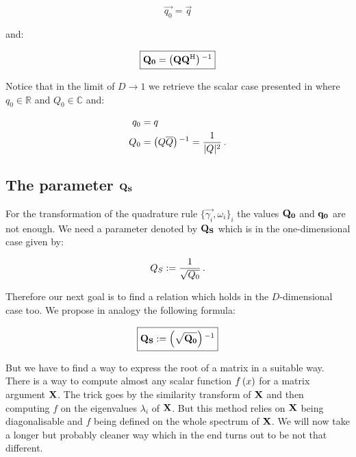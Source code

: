 \begin{equation} \label{eq:quad_mix_Dd_homog_q0}
\boxed{
  \vec{q_0} = \vec{q}
}
\end{equation}

and:

\begin{equation} \label{eq:quad_mix_Dd_homog_Q0}
\boxed{
  \mathbf{Q_0} = \left( \mathbf{Q} \mathbf{Q}{}^{\textnormal{H}} \right){}^{-1}
}
\end{equation}

Notice that in the limit of $D \rightarrow 1$ we retrieve the scalar case
presented in \cite{B_bachelor_thesis} where $q_0 \in \mathbb{R}$ and
$Q_0 \in \mathbb{C}$ and:

\begin{align*}
  q_0 & = q \\
  Q_0 & = \left( Q \overline{Q} \right){}^{-1} = \frac{1}{|Q|^2} \,.
\end{align*}


\subsection{The parameter $\mathbf{Q_S}$}


For the transformation of the quadrature rule $\{\vec{\gamma_i}, \omega_i\}_i$
the values $\mathbf{Q_0}$ and $\mathbf{q_0}$ are not enough. We need a parameter
denoted by $\mathbf{Q_S}$ which is in the one-dimensional case given by:

\begin{equation*}
  Q_S := \frac{1}{\sqrt{Q_0}} \,.
\end{equation*}

Therefore our next goal is to find a relation which holds in the $D$-dimensional
case too. We propose in analogy the following formula:

\begin{equation} \label{eq:mixing_Qs}
\boxed{
  \mathbf{Q_S} := \left( \sqrt{\mathbf{Q_0}} \right){}^{-1}
}
\end{equation}

But we have to find a way to express the root of a matrix in a suitable way. There
is a way to compute almost any scalar function $f\left( x \right)$ for a matrix argument
$\mathbf{X}$. The trick goes by the similarity transform of $\mathbf{X}$ and then
computing $f$ on the eigenvalues $\lambda_i$ of $\mathbf{X}$. But this method relies
on $\mathbf{X}$ being diagonalisable and $f$ being defined on the whole spectrum of
$\mathbf{X}$. We will now take a longer but probably cleaner way which in the end
turns out to be not that different.

